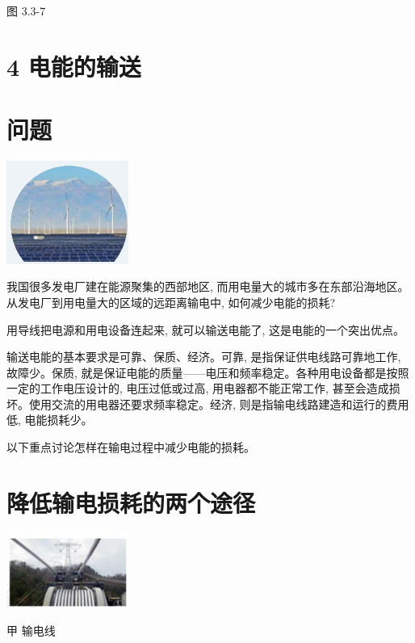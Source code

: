\documentclass[10pt]{article}
\begin{document}
图 3.3-7

\section*{4 电能的输送}

\section*{问题}

\begin{center}
\includegraphics[max width=0.3\textwidth]{images/01910e72-c5b7-7ed5-a6d4-fb3a5faefc32_68_620123.jpg}
\end{center}

我国很多发电厂建在能源聚集的西部地区, 而用电量大的城市多在东部沿海地区。从发电厂到用电量大的区域的远距离输电中, 如何减少电能的损耗?

用导线把电源和用电设备连起来, 就可以输送电能了, 这是电能的一个突出优点。

输送电能的基本要求是可靠、保质、经济。可靠, 是指保证供电线路可靠地工作, 故障少。保质, 就是保证电能的质量——电压和频率稳定。各种用电设备都是按照一定的工作电压设计的, 电压过低或过高, 用电器都不能正常工作, 甚至会造成损坏。使用交流的用电器还要求频率稳定。经济, 则是指输电线路建造和运行的费用低, 电能损耗少。

以下重点讨论怎样在输电过程中减少电能的损耗。

\section*{降低输电损耗的两个途径}

\begin{center}
\includegraphics[max width=0.3\textwidth]{images/01910e72-c5b7-7ed5-a6d4-fb3a5faefc32_68_746347.jpg}
\end{center}

甲 输电线
\end{document}
